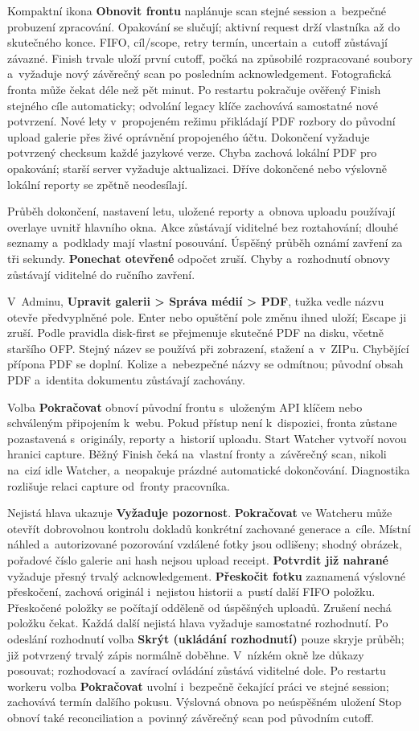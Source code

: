 \documentclass[11pt,a4paper]{article}
\newcommand{\ui}[1]{\textbf{#1}}
\begin{document}
Kompaktní ikona \ui{Obnovit frontu} naplánuje scan stejné session a~bezpečné
probuzení zpracování. Opakování se slučují; aktivní request drží vlastníka
až do skutečného konce. FIFO, cíl/scope, retry termín, uncertain a~cutoff
zůstávají závazné. Finish trvale uloží první cutoff, počká na způsobilé
rozpracované soubory a~vyžaduje nový závěrečný scan po posledním
acknowledgement. Fotografická fronta může čekat déle než pět minut.
Po restartu pokračuje ověřený Finish stejného cíle automaticky;
odvolání legacy klíče zachovává samostatné nové potvrzení.
Nové lety v~propojeném režimu přikládají PDF rozbory do původní upload galerie
přes živé oprávnění propojeného účtu. Dokončení vyžaduje potvrzený checksum
každé jazykové verze. Chyba zachová lokální PDF pro opakování; starší server
vyžaduje aktualizaci. Dříve dokončené nebo výslovně lokální reporty se
zpětně neodesílají.

Průběh dokončení, nastavení letu, uložené reporty a~obnova uploadu používají
overlaye uvnitř hlavního okna. Akce zůstávají viditelné bez roztahování;
dlouhé seznamy a~podklady mají vlastní posouvání. Úspěšný průběh oznámí
zavření za tři sekundy. \ui{Ponechat otevřené} odpočet zruší.
Chyby a~rozhodnutí obnovy zůstávají viditelné do ručního zavření.

V~Adminu, \ui{Upravit galerii > Správa médií > PDF}, tužka vedle názvu
otevře předvyplněné pole. Enter nebo opuštění pole změnu ihned uloží;
Escape ji zruší. Podle pravidla disk-first se přejmenuje skutečné PDF na disku,
včetně staršího OFP. Stejný název se používá při zobrazení, stažení a~v~ZIPu.
Chybějící přípona PDF se doplní. Kolize a~nebezpečné názvy se odmítnou;
původní obsah PDF a~identita dokumentu zůstávají zachovány.

Volba \ui{Pokračovat} obnoví původní frontu s~uloženým API klíčem nebo
schváleným připojením k~webu. Pokud přístup není k~dispozici, fronta zůstane
pozastavená s~originály, reporty a~historií uploadu. Start Watcher vytvoří
novou hranici capture.
Běžný Finish čeká na~vlastní fronty a~závěrečný scan, nikoli na~cizí idle
Watcher, a~neopakuje prázdné automatické dokončování. Diagnostika rozlišuje
relaci capture od~fronty pracovníka.

Nejistá hlava ukazuje \ui{Vyžaduje pozornost}. \ui{Pokračovat} ve Watcheru
může otevřít dobrovolnou kontrolu dokladů konkrétní zachované generace a~cíle.
Místní náhled a~autorizované pozorování vzdálené fotky jsou odlišeny;
shodný obrázek, pořadové číslo galerie ani hash nejsou upload receipt.
\ui{Potvrdit již nahrané} vyžaduje přesný trvalý acknowledgement.
\ui{Přeskočit fotku} zaznamená výslovné přeskočení, zachová originál
i~nejistou historii a~pustí další FIFO položku. Přeskočené položky se
počítají odděleně od úspěšných uploadů. Zrušení nechá položku čekat.
Každá další nejistá hlava vyžaduje samostatné rozhodnutí.
Po odeslání rozhodnutí volba \ui{Skrýt (ukládání rozhodnutí)} pouze skryje
průběh; již potvrzený trvalý zápis normálně doběhne.
V~nízkém okně lze důkazy posouvat; rozhodovací a~zavírací ovládání zůstává
viditelné dole.
Po restartu workeru volba \ui{Pokračovat} uvolní
i~bezpečně čekající práci ve stejné session; zachovává termín dalšího pokusu.
Výslovná obnova po neúspěšném uložení Stop obnoví také reconciliation
a~povinný závěrečný scan pod původním cutoff.
\end{document}
